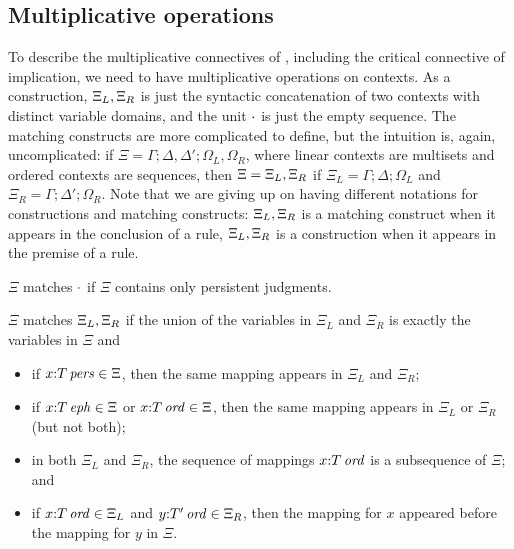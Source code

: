 
\subsection{Multiplicative operations}

To describe the multiplicative connectives of \ollll, including the critical
connective of implication, we need to have multiplicative operations on 
contexts. As a construction, ${\Xi_L},{\Xi_R}$ is just the
syntactic concatenation of two contexts with distinct variable domains, and
the unit $\cdot$ is just the empty sequence. The matching constructs
are more complicated to define, but the intuition is, again, 
uncomplicated: if 
$\Xi = \Gamma; \Delta, \Delta'; \Omega_L, \Omega_R$, where linear contexts
are multisets and ordered contexts are sequences, then 
$\Xi = {\Xi_L},{\Xi_R}$ if $\Xi_L = \Gamma; \Delta; \Omega_L$ and
$\Xi_R = \Gamma; \Delta'; \Omega_R$. Note that we are giving up on
having different notations for constructions and matching constructs: 
${\Xi_L},{\Xi_R}$ is a matching construct when it appears
in the conclusion of a rule, ${\Xi_L},{\Xi_R}$ is a construction
when it appears in the premise of a rule.

\bigskip
\begin{definition}[Conjunction]
$\Xi$ matches $\cdot$ if $\Xi$ contains only
persistent judgments.

\smallskip
\noindent
$\Xi$ matches ${\Xi_L},{\Xi_R}$ if the union 
of the variables in $\Xi_L$ and $\Xi_R$ is exactly the variables in $\Xi$
and 
\begin{itemize}
\item if $x{:}{T}\,{{\it pers}} \in \Xi$, then the same mapping appears in $\Xi_L$
  and $\Xi_R$;
\item if $x{:}{T}\,{{\it eph}} \in \Xi$ or $x{:}{T}\,{{\it ord}} \in \Xi$, then the
  same mapping appears in $\Xi_L$ or $\Xi_R$ (but not both); 
\item in both $\Xi_L$ and $\Xi_R$, 
  the sequence of mappings $x{:}{T}\,{{\it ord}}$ 
  is a subsequence of $\Xi$; and 
\item if $x{:}{T}\,{{\it ord}} \in \Xi_L$ and $y{:}{T'}\,{{\it ord}} \in \Xi_R$, then
  the mapping for $x$ appeared before the mapping for $y$ in $\Xi$. 
\end{itemize}
\end{definition}
\bigskip

